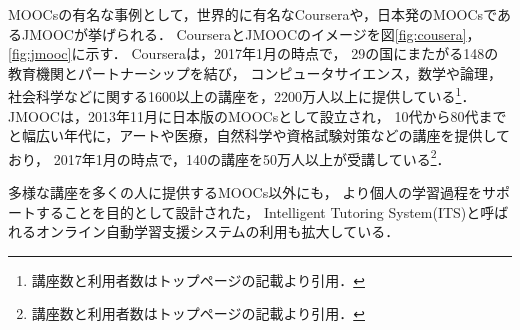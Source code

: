 \begin{figure}[htb]
\begin{center}
\end{center}
\end{figure}

MOOCsの有名な事例として，世界的に有名なCourseraや，日本発のMOOCsであるJMOOCが挙げられる．
CourseraとJMOOCのイメージを図\ref{fig:cousera}，\ref{fig:jmooc}に示す．
Courseraは，2017年1月の時点で，
29の国にまたがる148の教育機関とパートナーシップを結び，
コンピュータサイエンス，数学や論理，社会科学などに関する1600以上の講座を，2200万人以上に提供している\footnote{講座数と利用者数はトップページの記載より引用．}．
JMOOCは，2013年11月に日本版のMOOCsとして設立され，
10代から80代までと幅広い年代に，アートや医療，自然科学や資格試験対策などの講座を提供しており，
2017年1月の時点で，140の講座を50万人以上が受講している\footnote{講座数と利用者数はトップページの記載より引用．}．


多様な講座を多くの人に提供するMOOCs以外にも，
より個人の学習過程をサポートすることを目的として設計された，
Intelligent Tutoring System(ITS)と呼ばれるオンライン自動学習支援システムの利用も拡大している\cite{sleeman1982intelligent}．

